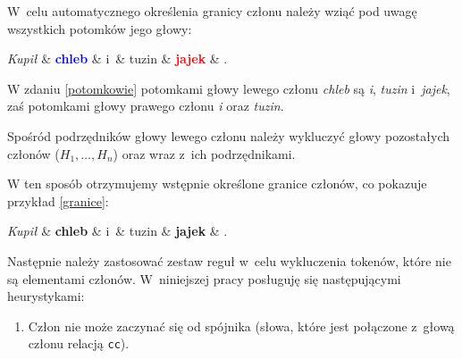 W~celu automatycznego określenia granicy członu należy wziąć pod uwagę wszystkich potomków jego głowy:

\begin{exe}
\ex \label{potomkowie}
\begin{dependency}[baseline=-\the\dimexpr\fontdimen22\textfont2\relax]
\begin{deptext}[column sep=1em, row sep=.1ex]
\emph{Kupił} \& \textbf{\textcolor{blue}{chleb}} \& i~\& tuzin \& \textbf{\textcolor{red}{jajek}} \& .  \\ 
\end{deptext}
\end{dependency}
\end{exe}

W zdaniu \eqref{potomkowie} potomkami głowy lewego członu \textit{chleb} są \textit{i}, \textit{tuzin} i~\textit{jajek}, zaś potomkami głowy prawego członu \textit{i} oraz \textit{tuzin}.

Spośród podrzędników głowy lewego członu należy wykluczyć głowy pozostałych członów ($H_{1}, \ldots , H_{n}$) oraz wraz z~ich podrzędnikami.

W ten sposób otrzymujemy wstępnie określone granice członów, co pokazuje przykład \eqref{granice}:

\begin{exe}
\ex \label{granice}
\begin{dependency}[baseline=-\the\dimexpr\fontdimen22\textfont2\relax]
\begin{deptext}[column sep=1em, row sep=.1ex]
\emph{Kupił} \& \textbf{chleb} \& i~\& tuzin \& \textbf{jajek} \& .  \\ 
\end{deptext}
\end{dependency}
\end{exe}

Następnie należy zastosować zestaw reguł w~celu wykluczenia tokenów, które nie są elementami członów. W~niniejszej pracy posługuję się następującymi heurystykami:

\begin{enumerate}
\item[\namedlabel{H1}{(H1)}]
Człon nie może zaczynać się od spójnika (słowa, które jest połączone z~głową członu relacją \texttt{cc}).
\end{enumerate}

